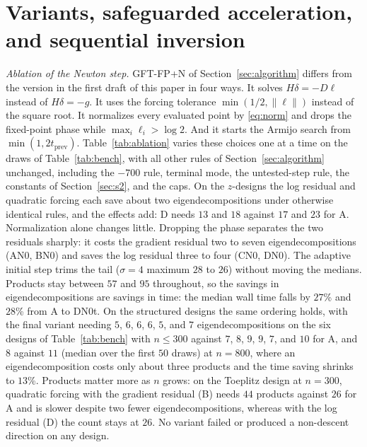 \documentclass[11pt]{article}
\begin{document}
\section{Variants, safeguarded acceleration, and sequential inversion}\label{sec:variants}

\emph{Ablation of the Newton step.} GFT-FP+N of
Section~\ref{sec:algorithm} differs from the version in the first
draft of this paper in four ways. It solves $H\delta=-D\ell$ instead
of $H\delta=-g$. It uses the forcing tolerance $\min(1/2,\|\ell\|)$
instead of the square root. It normalizes every evaluated point by
\eqref{eq:norm} and drops the fixed-point phase while
$\max_i\ell_i>\log2$. And it starts the Armijo search from
$\min(1,2t_{\mathrm{prev}})$. Table~\ref{tab:ablation} varies these
choices one at a time on the draws of Table~\ref{tab:bench}, with all
other rules of Section~\ref{sec:algorithm} unchanged, including the
$-700$ rule, terminal mode, the untested-step rule, the constants of
Section~\ref{sec:s2}, and the caps. On the $z$-designs the log residual and quadratic forcing each save
about two eigendecompositions under otherwise identical rules, and the
effects add: D needs $13$ and $18$ against $17$ and $23$ for A.
Normalization alone changes little. Dropping the phase separates the
two residuals sharply: it costs the gradient residual two to seven
eigendecompositions (AN0, BN0) and saves the log residual three to
four (CN0, DN0). The adaptive initial step trims the tail ($\sigma=4$
maximum $28$ to $26$) without moving the medians. Products stay between
$57$ and $95$ throughout, so the savings in eigendecompositions are
savings in time: the median wall time falls by $27$\% and $28$\% from A
to DN0t. On the structured designs the same ordering holds, with the
final variant needing $5$, $6$, $6$, $6$, $5$, and $7$ eigendecompositions
on the six designs of Table~\ref{tab:bench} with $n\leq300$ against
$7$, $8$, $9$, $9$, $7$, and $10$ for A, and $8$ against $11$ (median
over the first $50$ draws) at $n=800$, where an eigendecomposition
costs only about three products and the time saving shrinks to
$13$\%. Products matter more as $n$ grows: on the Toeplitz design at
$n=300$, quadratic forcing with the gradient residual (B) needs $44$
products against $26$ for A and is slower despite two fewer
eigendecompositions, whereas with the log residual (D) the count
stays at $26$. No variant failed or produced a non-descent direction
on any design.
\end{document}
